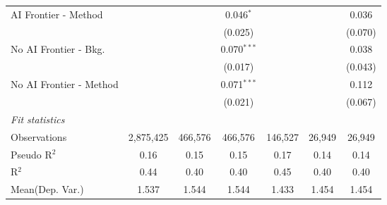 \begin{tabular}{lcccccc}
   AI Frontier - Method    &               &               & 0.046$^{*}$   &               &               & 0.036\\   
                           &               &               & (0.025)       &               &               & (0.070)\\   
   No AI Frontier - Bkg.   &               &               & 0.070$^{***}$ &               &               & 0.038\\   
                           &               &               & (0.017)       &               &               & (0.043)\\   
   No AI Frontier - Method &               &               & 0.071$^{***}$ &               &               & 0.112\\   
                           &               &               & (0.021)       &               &               & (0.067)\\   
   \midrule
   \emph{Fit statistics}\\
   Observations            & 2,875,425     & 466,576       & 466,576       & 146,527       & 26,949        & 26,949\\  
   Pseudo R$^2$            & 0.16          & 0.15          & 0.15          & 0.17          & 0.14          & 0.14\\  
   R$^2$                   & 0.44          & 0.40          & 0.40          & 0.45          & 0.40          & 0.40\\  
Mean(Dep. Var.) & 1.537 & 1.544 & 1.544 & 1.433 & 1.454 & 1.454 \\
   

\end{tabular}
